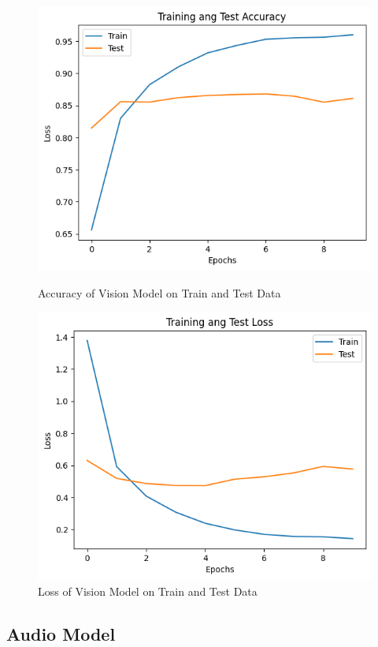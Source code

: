 \documentclass[fleqn, 10pt, twoside]{IOEGC}
\begin{document}
\begin{figure}[hbt]
	\centering
	\begin{minipage}[t]{0.45\textwidth}
		\centering
		\includegraphics[width=0.8\linewidth]{Graphics/accuracy_vision_model.png}
		\caption{Accuracy of Vision Model on Train and Test Data}
		\label{accuracy-vision}
	\end{minipage}
	\hfill
	\begin{minipage}[t]{0.45\textwidth}
		\centering
		\includegraphics[width=0.8\linewidth]{Graphics/loss_vision.png}
		\caption{Loss of Vision Model on Train and Test Data}
		\label{loss-vision}
	\end{minipage}
\end{figure}
\clearpage



\subsection{Audio Model}
\end{document}
